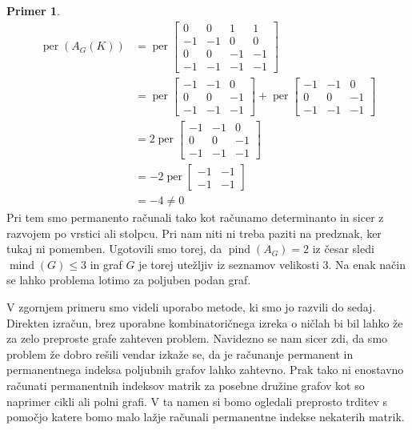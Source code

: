\documentclass[12pt,a4paper,twoside]{article}
\theoremstyle{definition} %
\newtheorem{primer}[definicija]{Primer}
\theoremstyle{plain} %
\numberwithin{equation}{section}  %
\DeclareMathOperator{\per}{per}
\DeclareMathOperator{\mind}{mind}
\DeclareMathOperator{\pind}{pind}
\begin{document}
\begin{primer}
\begin{equation*}
\begin{split}
\per(A_G(K)) &= \per \left[ \begin{matrix} 0 & 0 & 1 & 1 \\ -1 & -1 & 0 & 0 \\ 0 & 0 & -1 & -1 \\ -1 & -1 & -1 & -1 \end{matrix} \right] \\
&=\per \left[ \begin{matrix} -1 & -1 & 0 \\ 0 & 0 & -1 \\ -1 & -1 & -1 \end{matrix} \right] + \per \left[ \begin{matrix} -1 & -1 & 0 \\ 0 & 0 & -1 \\ -1 & -1 & -1 \end{matrix} \right] \\
&= 2 \per\left[ \begin{matrix} -1 & -1 & 0 \\ 0 & 0 & -1 \\ -1 & -1 & -1 \end{matrix} \right] \\
& =-2 \per \left[ \begin{matrix} -1 & -1 \\ -1 & -1 \end{matrix} \right] \\
&=-4 \neq 0
\end{split}
\end{equation*}
Pri tem smo permanento računali tako kot računamo determinanto in sicer z razvojem po vrstici ali stolpcu. Pri nam niti ni treba paziti na predznak, ker tukaj ni pomemben. Ugotovili smo torej, da $\pind(A_G) = 2$ iz česar sledi $\mind(G) \le 3$ in graf $G$ je torej utežljiv iz seznamov velikosti $3$. Na enak način se lahko problema lotimo za poljuben podan graf.
\end{primer}
V zgornjem primeru smo videli uporabo metode, ki smo jo razvili do sedaj. Direkten izračun, brez uporabne kombinatoričnega izreka o ničlah bi bil lahko že za zelo preproste grafe zahteven problem. Navidezno se nam sicer zdi, da smo problem že dobro rešili vendar izkaže se, da je računanje permanent in permanentnega indeksa poljubnih grafov lahko zahtevno. Prak tako ni enostavno računati permanentnih indeksov matrik za posebne družine grafov kot so naprimer cikli ali polni grafi. V ta namen si bomo ogledali preprosto trditev s pomočjo katere bomo malo lažje računali permanentne indekse nekaterih matrik.
\end{document}
